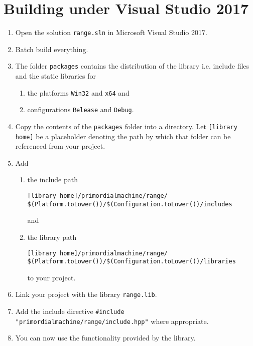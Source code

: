 \documentclass[oneside]{article}
\begin{document}
\section{Building under Visual Studio 2017}
\begin{enumerate}
\item Open the solution \texttt{range.sln} in Microsoft Visual Studio 2017.
\item Batch build everything.
\item The folder \texttt{packages} contains the distribution of the library i.e. include files and the
      static libraries for
  \begin{enumerate}
    \item the platforms \texttt{Win32} and \texttt{x64} and
    \item configurations \texttt{Release} and \texttt{Debug}.
  \end{enumerate}
\item Copy the contents of the \verb+packages+ folder into a directory. Let
      \verb+[library home]+ be a placeholder denoting the path by which that folder
      can be referenced from your project.
\item Add
  \begin{enumerate}
    \item the include path
\begin{verbatim}
[library home]/primordialmachine/range/
$(Platform.toLower())/$(Configuration.toLower())/includes
\end{verbatim}
	and
    \item the library path
\begin{verbatim}
[library home]/primordialmachine/range/
$(Platform.toLower())/$(Configuration.toLower())/libraries
\end{verbatim}
    to your project.
\end{enumerate}
\item Link your project with the library \verb+range.lib+.
\item Add the include directive \verb+#include "primordialmachine/range/include.hpp"+ where appropriate.
\item You can now use the functionality provided by the library.
\end{enumerate}
\end{document}
